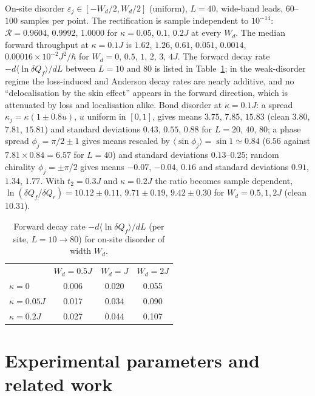 \documentclass[reprint,aps,prl,superscriptaddress,nofootinbib,floatfix]{revtex4-2}
\newcommand{\R}{\mathcal{R}}
\newcommand{\dQ}{\delta Q}
\begin{document}
On-site disorder $\varepsilon_j\in[-W_d/2,W_d/2]$ (uniform), $L=40$, wide-band leads, $60$--$100$ samples per point. The rectification is sample independent to $10^{-14}$: $\R=0.9604$, $0.9992$, $1.0000$ for $\kappa=0.05$, $0.1$, $0.2J$ at every $W_d$. The median forward throughput at $\kappa=0.1J$ is $1.62$, $1.26$, $0.61$, $0.051$, $0.0014$, $0.00016\times10^{-2}J^2/\hbar$ for $W_d=0$, $0.5$, $1$, $2$, $3$, $4J$. The forward decay rate $-d\langle\ln\dQ_f\rangle/dL$ between $L=10$ and $80$ is listed in Table~\ref{tab:decay}; in the weak-disorder regime the loss-induced and Anderson decay rates are nearly additive, and no ``delocalisation by the skin effect'' appears in the forward direction, which is attenuated by loss and localisation alike. Bond disorder at $\kappa=0.1J$: a spread $\kappa_j=\kappa(1\pm0.8u)$, $u$ uniform in $[0,1]$, gives means $3.75$, $7.85$, $15.83$ (clean $3.80$, $7.81$, $15.81$) and standard deviations $0.43$, $0.55$, $0.88$ for $L=20$, $40$, $80$; a phase spread $\phi_j=\pi/2\pm1$ gives means rescaled by $\langle\sin\phi_j\rangle=\sin1\simeq0.84$ ($6.56$ against $7.81\times0.84=6.57$ for $L=40$) and standard deviations $0.13$--$0.25$; random chirality $\phi_j=\pm\pi/2$ gives means $-0.07$, $-0.04$, $0.16$ and standard deviations $0.91$, $1.34$, $1.77$. With $t_2=0.3J$ and $\kappa=0.2J$ the ratio becomes sample dependent, $\ln(\dQ_f/\dQ_r)=10.12\pm0.11$, $9.71\pm0.19$, $9.42\pm0.30$ for $W_d=0.5,1,2J$ (clean $10.31$).

\begin{table}[h]
\caption{Forward decay rate $-d\langle\ln\dQ_f\rangle/dL$ (per site, $L=10\to80$) for on-site disorder of width $W_d$.}
\label{tab:decay}
\begin{ruledtabular}
\begin{tabular}{lccc}
 & $W_d=0.5J$ & $W_d=J$ & $W_d=2J$ \\
\colrule
$\kappa=0$ & 0.006 & 0.020 & 0.055 \\
$\kappa=0.05J$ & 0.017 & 0.034 & 0.090 \\
$\kappa=0.2J$ & 0.027 & 0.044 & 0.107 \\
\end{tabular}
\end{ruledtabular}
\end{table}

\section{Experimental parameters and related work}
\label{sec:exp}
\end{document}
